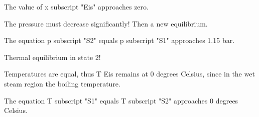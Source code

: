 The value of x subscript "Eis" approaches zero.

The pressure must decrease significantly! Then a new equilibrium.

The equation p subscript "S2" equals p subscript "S1" approaches 1.15 bar.

Thermal equilibrium in state 2!

Temperatures are equal, thus T Eis remains at 0 degrees Celsius, since in the wet steam region the boiling temperature.

The equation T subscript "S1" equals T subscript "S2" approaches 0 degrees Celsius.